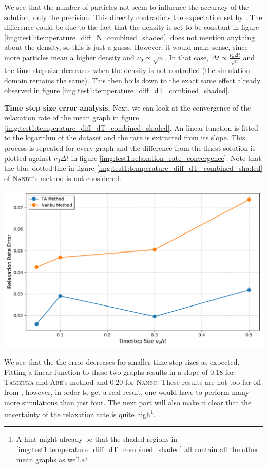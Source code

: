 We see that the number of particles not seem to influence the accuracy of the solution, only the precision. This directly contradicts the expectation set by \cite[4317]{Wang2008}. The difference could be due to the fact that the density is set to be constant in figure \ref{img:test1:temperature_diff_N_combined_shaded}. \cite{Wang2008} does not mention anything about the density, so this is just a guess. However, it would make sense, since more particles mean a higher density and $\nu_0 \propto \sqrt{n}$. In that case, $\Delta t \propto \frac{\nu_0\Delta t}{\sqrt{n}}$ and the time step size decreases when the density is not controlled (the simulation domain remains the same). This then boils down to the exact same effect already observed in figure \ref{img:test1:temperature_diff_dT_combined_shaded}.

\textbf{Time step size error analysis.} Next, we can look at the convergence of the relaxation rate of the mean graph in figure \ref{img:test1:temperature_diff_dT_combined_shaded}. An linear function is fitted to the logarithm of the dataset and the rate is extracted from its slope. This process is repeated for every graph and the difference from the finest solution is plotted against $\nu_0 \Delta t$ in figure \ref{img:test1:relaxation_rate_convergence}. Note that the blue dotted line in figure \ref{img:test1:temperature_diff_dT_combined_shaded} of \textsc{Nanbu}'s method is not considered. \\
\begin{minipage}[h]{\linewidth}
    \vspace{5pt}
    \centering
    \includegraphics[width=0.75\linewidth]{ressources/test1/relaxation_rate_convergence.pdf}
    \label{img:test1:relaxation_rate_convergence}
    \vspace{5pt}
\end{minipage}
We see that the the error decreases for smaller time step sizes as expected. Fitting a linear function to these two graphs results in a slope of $0.18$ for \textsc{Takizuka} and \textsc{Abe}'s method and $0.20$ for \textsc{Nanbu}. These results are not too far off from \cite[4316]{Wang2008}, however, in order to get a real result, one would have to perform many more simulations than just four. The next part will also make it clear that the uncertainty of the relaxation rate is quite high\footnote{A hint might already be that the shaded regions in \ref{img:test1:temperature_diff_dT_combined_shaded} all contain all the other mean graphs as well.}. 

